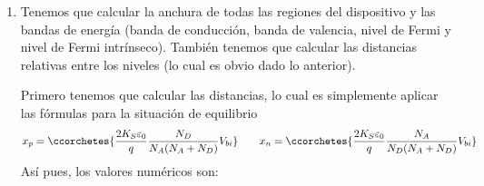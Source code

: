     \begin{enumerate}[label=\alph*)]
        \item Tenemos que calcular la anchura de todas las regiones del dispositivo y las bandas de energía (banda de conducción, banda de valencia, nivel de Fermi y nivel de Fermi intrínseco). También tenemos que calcular las distancias relativas entre los niveles (lo cual es obvio dado lo anterior).

        Primero tenemos que calcular las distancias, lo cual es simplemente aplicar las fórmulas para la situación de equilibrio
        \begin{equation}
            x_p = \ccorchetes{\frac{2K_S\varepsilon_0}{q} \frac{N_D}{N_A(N_A+N_D)}  V_{bi}}   \qquad
            x_n = \ccorchetes{\frac{2K_S\varepsilon_0}{q} \frac{N_A}{N_D(N_A+N_D)}  V_{bi}}
        \end{equation}
        Así pues, los valores numéricos son:


\end{enumerate}
